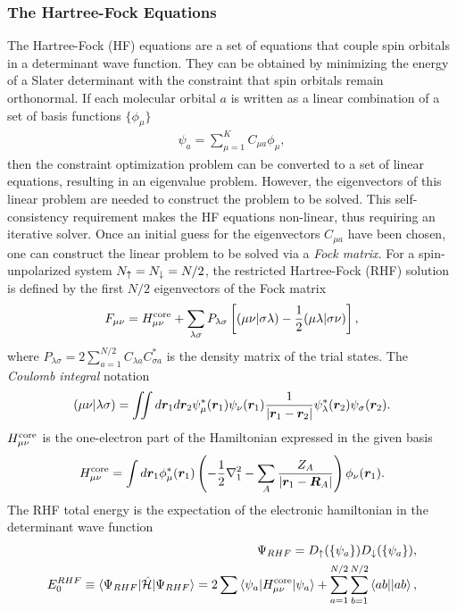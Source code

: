 \subsubsection{The Hartree-Fock Equations}
The Hartree-Fock (HF) equations are a set of equations that couple spin orbitals in a determinant wave function. They can be obtained by minimizing the energy of a Slater determinant with the constraint that spin orbitals remain orthonormal. If each molecular orbital $a$ is written as a linear combination of a set of basis functions $\{\phi_\mu\}$
\begin{align} \label{eq:hf-psia}
\psi_a = \sum\limits_{\mu=1}^K C_{\mu a} \phi_\mu,
\end{align}
then the constraint optimization problem can be converted to a set of linear equations, resulting in an eigenvalue problem.
However, the eigenvectors of this linear problem are needed to construct the problem to be solved.
This self-consistency requirement makes the HF equations non-linear, thus requiring an iterative solver.
Once an initial guess for the eigenvectors $C_{\mu a}$ have been chosen, one can construct the linear problem to be solved via a \emph{Fock matrix}.
For a spin-unpolarized system $N_{\uparrow}=N_{\downarrow}=N/2$, the restricted Hartree-Fock (RHF) solution is defined by the first $N/2$ eigenvectors of the Fock matrix
\begin{align}
F_{\mu\nu} = H^{\text{core}}_{\mu\nu} + \sum\limits_{\lambda\sigma} P_{\lambda\sigma} \left[
(\mu\nu|\sigma\lambda) - \frac{1}{2}(\mu\lambda|\sigma\nu)
\right],
\end{align} %
where $P_{\lambda\sigma}=2\sum_{a=1}^{N/2} C_{\lambda a}C_{\sigma a}^*$ is the density matrix of the trial states. The \textit{Coulomb integral} notation
\begin{align}
(\mu\nu|\lambda\sigma) = \iint d\boldsymbol{r}_1 d\boldsymbol{r}_2 \psi_\mu^*(\boldsymbol{r}_1)\psi_{\nu}(\boldsymbol{r}_1)
\frac{1}{\vert\boldsymbol{r}_1-\boldsymbol{r}_2\vert}
\psi_\lambda^*(\boldsymbol{r}_2)\psi_\sigma(\boldsymbol{r}_2).
\end{align}
$H^{\text{core}}_{\mu\nu}$ is the one-electron part of the Hamiltonian expressed in the given basis %
\begin{align}
H^{\text{core}}_{\mu\nu} = \int d\boldsymbol{r}_1 \phi_\mu^*(\boldsymbol{r}_1)\left(
-\frac{1}{2}\nabla_1^2-\sum\limits_A \dfrac{Z_A}{\vert\boldsymbol{r}_1-\boldsymbol{R}_A\vert}
\right)  \phi_\nu(\boldsymbol{r}_1).
\end{align}
The RHF total energy is the expectation of the electronic hamiltonian in the determinant wave function
\begin{align}
\Psi_{RHF} = D_{\uparrow}(\{\psi_a\}) D_{\downarrow}(\{\psi_a\}), \\
E^{RHF}_0 \equiv \braket{\Psi_{RHF}|\hat{\mathcal{H}}|\Psi_{RHF}} = 2\sum\limits\braket{\psi_a|H^{\text{core}}_{\mu\nu}|\psi_a} + \sum\limits_{a=1}^{N/2}\sum\limits_{b=1}^{N/2} \braket{ab||ab},
\end{align}

